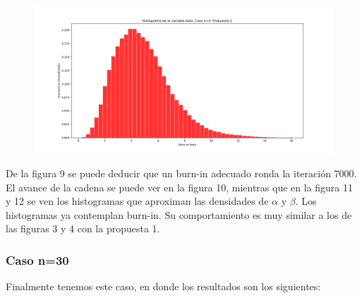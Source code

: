 \documentclass[letterpaper]{article}
\newcommand{\1}{\mathds{1}}
\theoremstyle{definition}
\theoremstyle{definition}
\theoremstyle{definition}
\theoremstyle{definition}
\theoremstyle{definition}
\begin{document}
\begin{figure}[h!]
    \centering
    \includegraphics[width=\linewidth]{12.png}
    \caption{}
\end{figure} 
De la figura 9 se puede deducir que un burn-in adecuado ronda la iteración 7000. El avance de la cadena 
se puede ver en la figura 10, mientras que en la figura 11 y 12 se ven los histogramas que aproximan 
las densidades de $\alpha$ y $\beta$. Los histogramas ya contemplan burn-in. Su comportamiento es muy similar a los de las figuras 3 y 4 con la propuesta 1.

\subsubsection*{Caso n=30}
Finalmente tenemos este caso, en donde los resultados son los siguientes:
\end{document}
